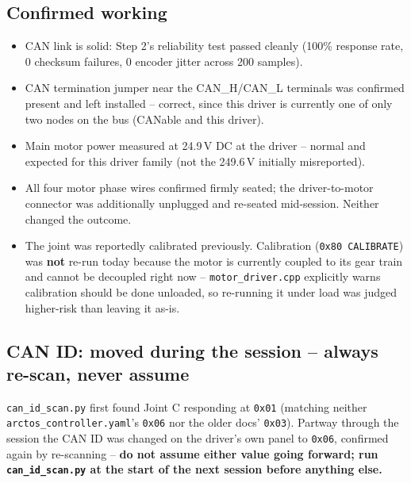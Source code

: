 \documentclass[11pt,letterpaper]{article}
\begin{document}
\subsection{Confirmed working}
\begin{itemize}
    \item CAN link is solid: Step 2's reliability test passed cleanly (100\% response rate, 0 checksum failures, 0 encoder jitter across 200 samples).
    \item CAN termination jumper near the CAN\_H/CAN\_L terminals was confirmed present and left installed -- correct, since this driver is currently one of only two nodes on the bus (CANable and this driver).
    \item Main motor power measured at 24.9\,V DC at the driver -- normal and expected for this driver family (not the 249.6\,V initially misreported).
    \item All four motor phase wires confirmed firmly seated; the driver-to-motor connector was additionally unplugged and re-seated mid-session. Neither changed the outcome.
    \item The joint was reportedly calibrated previously. Calibration (\texttt{0x80 CALIBRATE}) was \textbf{not} re-run today because the motor is currently coupled to its gear train and cannot be decoupled right now -- \texttt{motor\_driver.cpp} explicitly warns calibration should be done unloaded, so re-running it under load was judged higher-risk than leaving it as-is.
\end{itemize}

\subsection{CAN ID: moved during the session -- always re-scan, never assume}
\texttt{can\_id\_scan.py} first found Joint C responding at \texttt{0x01} (matching neither \texttt{arctos\_controller.yaml}'s \texttt{0x06} nor the older docs' \texttt{0x03}). Partway through the session the CAN ID was changed on the driver's own panel to \texttt{0x06}, confirmed again by re-scanning -- \textbf{do not assume either value going forward; run \texttt{can\_id\_scan.py} at the start of the next session before anything else.}
\end{document}
